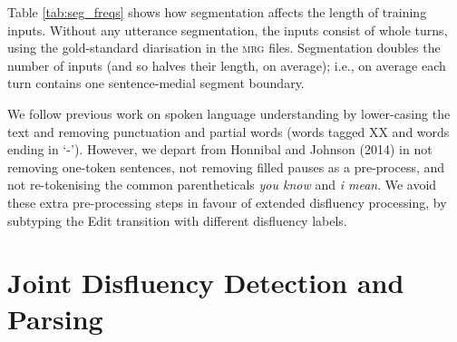 \documentclass[11pt,letterpaper]{article}
\begin{document}
Table \ref{tab:seg_freqs} shows how segmentation affects the length of training
inputs.  Without any utterance segmentation, the inputs consist of whole turns,
using the gold-standard diarisation in the \textsc{mrg} files.
Segmentation doubles the number of inputs (and so halves their length, on average);
i.e., on average each turn contains one sentence-medial segment boundary.


We follow previous work on spoken language understanding by lower-casing the text
and removing punctuation and partial words (words tagged XX and words ending in
`-').  However, we depart from Honnibal and Johnson (2014) in not removing one-token
sentences, not removing filled pauses as a pre-process, and not
re-tokenising the common parentheticals \emph{you know} and \emph{i mean}.
We avoid these extra pre-processing steps in favour of extended disfluency processing,
by subtyping the Edit transition with different disfluency labels.

\section{Joint Disfluency Detection and Parsing}
\end{document}
